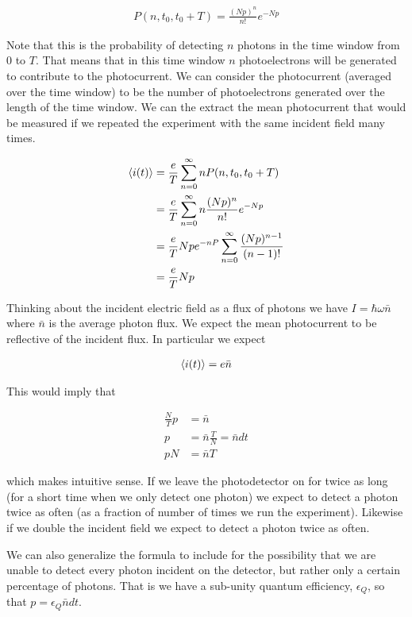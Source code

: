 \documentclass[12pt]{article}
\begin{document}
\begin{align}
P(n,t_0,t_0+T) = \frac{(Np)^n}{n!}e^{-Np}
\end{align}

Note that this is the probability of detecting $n$ photons in the time window from $0$ to $T$. That means that in this time window $n$ photoelectrons will be generated to contribute to the photocurrent. We can consider the photocurrent (averaged over the time window) to be the number of photoelectrons generated over the length of the time window. We can the extract the mean photocurrent that would be measured if we repeated the experiment with the same incident field many times.

\begin{align}
\Braket{i(t)} &= \frac{e}{T}\sum_{n=0}^{\infty} n P(n,t_0,t_0+T)\\
&= \frac{e}{T} \sum_{n=0}^{\infty} n \frac{(Np)^n}{n!} e^{-Np}\\
&= \frac{e}{T} Np e^{-nP} \sum_{n=0}^{\infty} \frac{(Np)^{n-1}}{(n-1)!}\\
&= \frac{e}{T} Np
\end{align}

Thinking about the incident electric field as a flux of photons we have $I = \hbar \omega \bar{n}$ where $\bar{n}$ is the average photon flux. We expect the mean photocurrent to be reflective of the incident flux. In particular we expect

\begin{align}
\Braket{i(t)} = e \bar{n}
\end{align}

This would imply that

\begin{align}
\frac{N}{T} p &= \bar{n}\\
p &= \bar{n} \frac{T}{N} = \bar{n} dt\\
pN &= \bar{n}T
\end{align}

which makes intuitive sense. If we leave the photodetector on for twice as long (for a short time when we only detect one photon) we expect to detect a photon twice as often (as a fraction of number of times we run the experiment). Likewise if we double the incident field we expect to detect a photon twice as often. 

We can also generalize the formula to include for the possibility that we are unable to detect every photon incident on the detector, but rather only a certain percentage of photons. That is we have a sub-unity quantum efficiency, $\epsilon_Q$, so that $p = \epsilon_Q \bar{n} dt$.
\end{document}
